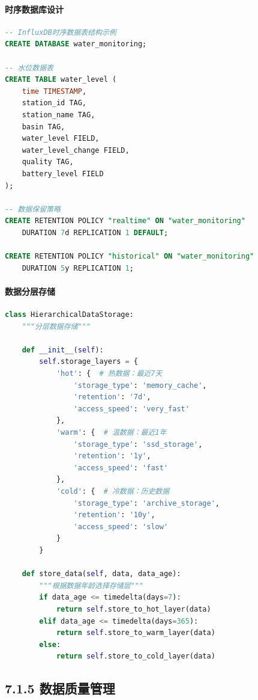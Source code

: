 \paragraph{时序数据库设计}\label{ux65f6ux5e8fux6570ux636eux5e93ux8bbeux8ba1}

\begin{lstlisting}[language=SQL]
-- InfluxDB时序数据表结构示例
CREATE DATABASE water_monitoring;

-- 水位数据表
CREATE TABLE water_level (
    time TIMESTAMP,
    station_id TAG,
    station_name TAG,
    basin TAG,
    water_level FIELD,
    water_level_change FIELD,
    quality TAG,
    battery_level FIELD
);

-- 数据保留策略
CREATE RETENTION POLICY "realtime" ON "water_monitoring" 
    DURATION 7d REPLICATION 1 DEFAULT;
    
CREATE RETENTION POLICY "historical" ON "water_monitoring" 
    DURATION 5y REPLICATION 1;
\end{lstlisting}

\paragraph{数据分层存储}\label{ux6570ux636eux5206ux5c42ux5b58ux50a8}

\begin{lstlisting}[language=Python]
class HierarchicalDataStorage:
    """分层数据存储"""
    
    def __init__(self):
        self.storage_layers = {
            'hot': {  # 热数据：最近7天
                'storage_type': 'memory_cache',
                'retention': '7d',
                'access_speed': 'very_fast'
            },
            'warm': {  # 温数据：最近1年
                'storage_type': 'ssd_storage',
                'retention': '1y',
                'access_speed': 'fast'
            },
            'cold': {  # 冷数据：历史数据
                'storage_type': 'archive_storage',
                'retention': '10y',
                'access_speed': 'slow'
            }
        }
    
    def store_data(self, data, data_age):
        """根据数据年龄选择存储层"""
        if data_age <= timedelta(days=7):
            return self.store_to_hot_layer(data)
        elif data_age <= timedelta(days=365):
            return self.store_to_warm_layer(data)
        else:
            return self.store_to_cold_layer(data)
\end{lstlisting}

\subsection{7.1.5
数据质量管理}\label{ux6570ux636eux8d28ux91cfux7ba1ux7406}

